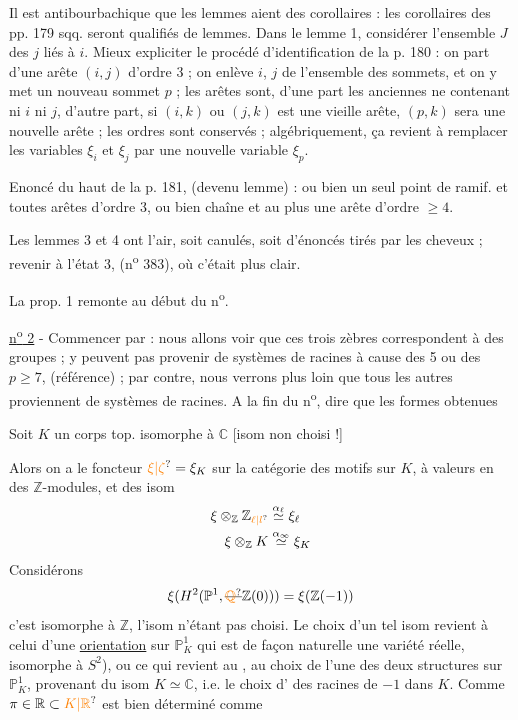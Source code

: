 \unsure{-} Il est antibourbachique que les lemmes aient des corollaires : les corollaires des pp. 179 sqq. seront qualifiés de lemmes. Dans le lemme 1, considérer l'ensemble $J$ des $j$ liés à $i$. Mieux expliciter le procédé d'identification de la p. 180 : on part d'une arête $(i,j)$ d'ordre 3 ; on enlève $i$, $j$ de l'ensemble des sommets, et on y met un nouveau sommet $p$ ; les arêtes sont, d'une part les anciennes ne contenant ni $i$ ni $j$, d'autre part, si $(i,k)$ ou $(j,k)$ est une vieille arête, $(p,k)$ sera une nouvelle arête ; les ordres sont conservés ; algébriquement, ça revient à remplacer les variables $\xi_i$ et $\xi_j$ par une nouvelle variable $\xi_p$.

Enoncé du haut de la p. 181, (devenu lemme) : ou bien un seul point de ramif. et toutes arêtes d'ordre 3, ou bien chaîne et au plus une arête d'ordre $\geq 4$.

Les lemmes 3 et 4 ont l'air, soit canulés, soit d'énoncés tirés par les cheveux ; revenir à l'état 3, (n\textsuperscript{o} 383), où c'était plus clair.

La prop. 1 remonte au début du n\textsuperscript{o}.

\uline{n\textsuperscript{o} 2} - Commencer par : nous allons voir que ces trois zèbres correspondent à des groupes ; y peuvent pas provenir de systèmes de racines à cause des 5 ou des $p\geq 7$, (référence) ; par contre, nous verrons plus loin que tous les autres proviennent de systèmes de racines. A la fin du n\textsuperscript{o}, dire que les formes obtenues

Soit $K$ un corps top. isomorphe à $\mathbb C$ [isom non choisi !]

Alors on a le foncteur  $\unsure{\xi|\zeta}=\xi_K$ sur la catégorie des motifs sur $K$, à valeurs en des $\mathbb Z$-modules, et des isom
\[
\begin{aligned}
 \xi\otimes_{\mathbb Z}\mathbb Z_{\unsure{\ell|l}} &\overset{\alpha_\ell}{\simeq} \xi_\ell\\
 \xi\otimes_{\mathbb Z}K &\overset{\alpha_\infty}{\simeq} \xi_K
\end{aligned}
\]
Considérons
\[
 \xi(H^2(\mathbb P^1,\deleted{\unsure{\mathbb Q}}\mathbb Z(0)))=\xi(\mathbb Z(-1))
\]
c'est isomorphe à $\mathbb Z$, l'isom n'étant pas choisi. Le choix d'un tel isom  revient à celui d'une \uline{orientation} sur $\mathbb P^1_K$ \unsure{[|(}qui est de façon naturelle une variété  réelle, isomorphe à $S^2$), ou ce qui revient au , au choix de l'une des deux structures  sur $\mathbb P^1_K$, provenant du   isom $K\simeq\mathbb C$, i.e. le choix d'\uline{} des racines de $-1$ dans $K$. Comme $\pi\in\mathbb R\subset\unsure{K|\mathbb R}$ est bien déterminé comme

